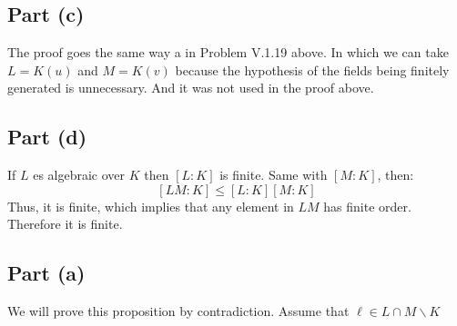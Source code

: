 \subsection*{Part (c)}
The proof goes the same way a in Problem V.1.19 above.
In which we can take $L=K(u)$ and $M=K(v)$ because the hypothesis of the fields being finitely generated is unnecessary.
And it was not used in the proof above.

\subsection*{Part (d)}
If $L$ es algebraic over $K$ then $[L:K]$ is finite. 
Same with $[M:K]$, then:
$$[LM:K]\leq [L:K][M:K]$$
Thus, it is finite, which implies that any element in $LM$ has finite order.
Therefore it is finite.

\subsection*{Part (a)}
We will prove this proposition by contradiction. Assume that $\ell \in L\cap M\backslash K$ 

